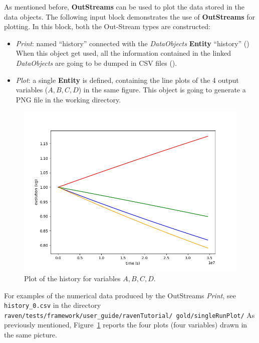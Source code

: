 As mentioned before, \textbf{OutStreams} can be used to plot the data stored in the data objects. The following
input block demonstrates the use of \textbf{OutStreams} for plotting.
In this block, both the Out-Stream types are constructed:
\begin{itemize}
  \item \textit{Print}: named ``history'' connected with the \textit{DataObjects} \textbf{Entity} ``history'' ()
  When this object get used, all the information contained in the linked  \textit{DataObjects} are going
  to be dumped in CSV files ().
  \item \textit{Plot}: a single  \textbf{Entity} is defined, containing the line plots of the 4 output variables
  ($A,B,C,D$) in the same figure. This object is going to generate a PNG file in the working directory.
\end{itemize}

\begin{figure}[h!]
  \centering
  \includegraphics[scale=0.7]{../../tests/framework/user_guide/ravenTutorial/gold/singleRunPlot/1-historyPlot_line-line-line-line.png}
  \caption{Plot of the history for variables $A,B,C,D$.}
  \label{fig:historyPlotLine}
\end{figure}

For examples of the numerical data produced by the OutStreams \textit{Print}, see \texttt{history\_0.csv} in the directory
 \texttt{raven/tests/framework/user\_guide/ravenTutorial/ gold/singleRunPlot/}
 As previously mentioned, Figure~\ref{fig:historyPlotLine} reports the four plots (four variables) drawn in the same picture.

